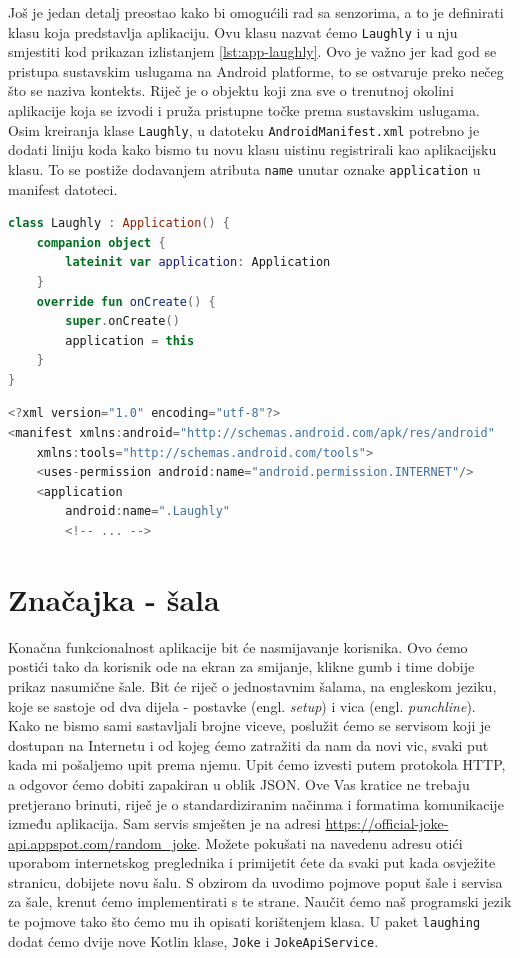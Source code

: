 \documentclass[11pt,a4paper,twoside]{article}
\begin{document}
Još je jedan detalj preostao kako bi omogućili rad sa senzorima, a to je definirati klasu koja predstavlja aplikaciju. Ovu klasu nazvat ćemo \texttt{Laughly} i u nju smjestiti kod prikazan izlistanjem \ref{lst:app-laughly}. Ovo je važno jer kad god se pristupa sustavskim uslugama na Android platforme, to se ostvaruje preko nečeg što se naziva kontekts. Riječ je o objektu koji zna sve o trenutnoj okolini aplikacije koja se izvodi i pruža pristupne točke prema sustavskim uslugama. Osim kreiranja klase \texttt{Laughly}, u datoteku \texttt{AndroidManifest.xml} potrebno je dodati liniju koda kako bismo tu novu klasu uistinu registrirali kao aplikacijsku klasu. To se postiže dodavanjem atributa \texttt{name} unutar oznake \texttt{application} u manifest datoteci.

\begin{lstlisting}[caption={Aplikacijska klasa - Laughly.kt}, label={lst:app-laughly}, language=Kotlin]
class Laughly : Application() {
	companion object {
		lateinit var application: Application
	}
	override fun onCreate() {
		super.onCreate()
		application = this
	}
}	
\end{lstlisting}

\begin{lstlisting}[caption={Manifest datoteka - AndroidManifest.xml}, label={lst:manifest}, language=Kotlin]
<?xml version="1.0" encoding="utf-8"?>
<manifest xmlns:android="http://schemas.android.com/apk/res/android"
	xmlns:tools="http://schemas.android.com/tools">
	<uses-permission android:name="android.permission.INTERNET"/>
	<application
		android:name=".Laughly"
		<!-- ... -->
\end{lstlisting}

\section{Značajka - šala}

Konačna funkcionalnost aplikacije bit će nasmijavanje korisnika. Ovo ćemo postići tako da korisnik ode na ekran za smijanje, klikne gumb i time dobije prikaz nasumične šale. Bit će riječ o jednostavnim šalama, na engleskom jeziku, koje se sastoje od dva dijela - postavke (engl. \textit{setup}) i vica (engl. \textit{punchline}). Kako ne bismo sami sastavljali brojne viceve, poslužit ćemo se servisom koji je dostupan na Internetu i od kojeg ćemo zatražiti da nam da novi vic, svaki put kada mi pošaljemo upit prema njemu. Upit ćemo izvesti putem protokola HTTP, a odgovor ćemo dobiti zapakiran u oblik JSON. Ove Vas kratice ne trebaju pretjerano brinuti, riječ je o standardiziranim načinma i formatima komunikacije između aplikacija. Sam servis smješten je na adresi \url{https://official-joke-api.appspot.com/random_joke}. Možete pokušati na navedenu adresu otići uporabom internetskog preglednika i primijetit ćete da svaki put kada osvježite stranicu, dobijete novu šalu. S obzirom da uvodimo pojmove poput šale i servisa za šale, krenut ćemo implementirati s te strane. Naučit ćemo naš programski jezik te pojmove tako što ćemo mu ih opisati korištenjem klasa. U paket \texttt{laughing} dodat ćemo dvije nove Kotlin klase, \texttt{Joke} i \texttt{JokeApiService}.
\end{document}
